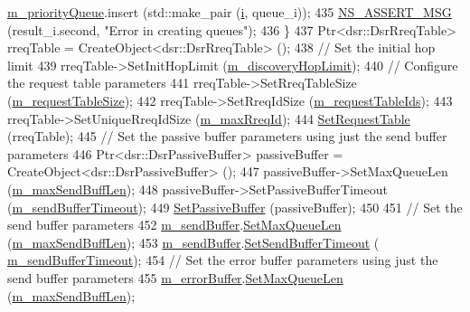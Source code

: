 \begin{DoxyCode}
      \hyperlink{classns3_1_1dsr_1_1DsrRouting_a4606c3dfb1099afbfe1e7cd1d1c3c8ee}{m\_priorityQueue}.insert (std::make\_pair (\hyperlink{bernuolliDistribution_8m_a6f6ccfcf58b31cb6412107d9d5281426}{i}, queue\_i));
435       \hyperlink{assert_8h_aff5ece9066c74e681e74999856f08539}{NS\_ASSERT\_MSG} (result\_i.second, \textcolor{stringliteral}{"Error in creating queues"});
436     \}
437   Ptr<dsr::DsrRreqTable> rreqTable = CreateObject<dsr::DsrRreqTable> ();
438   \textcolor{comment}{// Set the initial hop limit}
439   rreqTable->SetInitHopLimit (\hyperlink{classns3_1_1dsr_1_1DsrRouting_acf9cc5a2ae446403b8b57f3340fac178}{m\_discoveryHopLimit});
440   \textcolor{comment}{// Configure the request table parameters}
441   rreqTable->SetRreqTableSize (\hyperlink{classns3_1_1dsr_1_1DsrRouting_a8f6df12e2c9690f79943c2195af1be37}{m\_requestTableSize});
442   rreqTable->SetRreqIdSize (\hyperlink{classns3_1_1dsr_1_1DsrRouting_aac8b18967bf0bc05a7f0024ea55e99b1}{m\_requestTableIds});
443   rreqTable->SetUniqueRreqIdSize (\hyperlink{classns3_1_1dsr_1_1DsrRouting_a14ef1332178e76768359c27a45db9624}{m\_maxRreqId});
444   \hyperlink{classns3_1_1dsr_1_1DsrRouting_a62fbce24642000a21a4e7c783f77c205}{SetRequestTable} (rreqTable);
445   \textcolor{comment}{// Set the passive buffer parameters using just the send buffer parameters}
446   Ptr<dsr::DsrPassiveBuffer> passiveBuffer = CreateObject<dsr::DsrPassiveBuffer> ();
447   passiveBuffer->SetMaxQueueLen (\hyperlink{classns3_1_1dsr_1_1DsrRouting_a5cf78026e2a25a4468c04745f4a10c13}{m\_maxSendBuffLen});
448   passiveBuffer->SetPassiveBufferTimeout (\hyperlink{classns3_1_1dsr_1_1DsrRouting_a1f89794801db0336d92e4ca85fbc09a7}{m\_sendBufferTimeout});
449   \hyperlink{classns3_1_1dsr_1_1DsrRouting_a10d09f5b58b469d0a7c92926f61dd9ab}{SetPassiveBuffer} (passiveBuffer);
450 
451   \textcolor{comment}{// Set the send buffer parameters}
452   \hyperlink{classns3_1_1dsr_1_1DsrRouting_a887ae39d7060171753c0605d5c120549}{m\_sendBuffer}.\hyperlink{classns3_1_1dsr_1_1DsrSendBuffer_a01d2c15d2f020c8f46b628426a98450f}{SetMaxQueueLen} (\hyperlink{classns3_1_1dsr_1_1DsrRouting_a5cf78026e2a25a4468c04745f4a10c13}{m\_maxSendBuffLen});
453   \hyperlink{classns3_1_1dsr_1_1DsrRouting_a887ae39d7060171753c0605d5c120549}{m\_sendBuffer}.\hyperlink{classns3_1_1dsr_1_1DsrSendBuffer_a3b036f56c257571ae3fa5b5a49b2a57b}{SetSendBufferTimeout} (
      \hyperlink{classns3_1_1dsr_1_1DsrRouting_a1f89794801db0336d92e4ca85fbc09a7}{m\_sendBufferTimeout});
454   \textcolor{comment}{// Set the error buffer parameters using just the send buffer parameters}
455   \hyperlink{classns3_1_1dsr_1_1DsrRouting_a802e15bf588fd1e9ccd401221461397a}{m\_errorBuffer}.\hyperlink{classns3_1_1dsr_1_1DsrErrorBuffer_a33d6346a6ae17ae2c4deb4eb78e265d4}{SetMaxQueueLen} (\hyperlink{classns3_1_1dsr_1_1DsrRouting_a5cf78026e2a25a4468c04745f4a10c13}{m\_maxSendBuffLen});

\end{DoxyCode}
